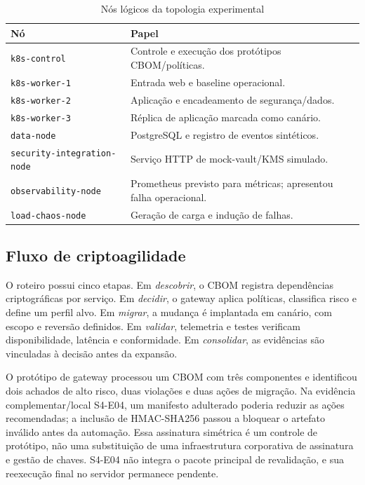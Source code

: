 \documentclass[12pt]{article}
\begin{document}
\begin{table}[ht]
\centering
\caption{N\'os l\'ogicos da topologia experimental}
\label{tab:nodes-pt}
\small
\begin{tabularx}{\textwidth}{p{}Y}
\toprule
\textbf{N\'o} & \textbf{Papel} \\
\midrule
\texttt{k8s-control} & Controle e execu\c{c}\~ao dos prot\'otipos CBOM/pol\'iticas. \\
\texttt{k8s-worker-1} & Entrada web e baseline operacional. \\
\texttt{k8s-worker-2} & Aplica\c{c}\~ao e encadeamento de seguran\c{c}a/dados. \\
\texttt{k8s-worker-3} & R\'eplica de aplica\c{c}\~ao marcada como can\'ario. \\
\texttt{data-node} & PostgreSQL e registro de eventos sint\'eticos. \\
\texttt{security-}\newline\texttt{integration-node} & Servi\c{c}o HTTP de mock-vault/KMS simulado. \\
\texttt{observability-node} & Prometheus previsto para m\'etricas; apresentou falha operacional. \\
\texttt{load-chaos-node} & Gera\c{c}\~ao de carga e indu\c{c}\~ao de falhas. \\
\bottomrule
\end{tabularx}
\end{table}

\subsection{Fluxo de criptoagilidade}
O roteiro possui cinco etapas. Em \textit{descobrir}, o CBOM registra depend\^encias criptogr\'aficas por servi\c{c}o. Em \textit{decidir}, o gateway aplica pol\'iticas, classifica risco e define um perfil alvo. Em \textit{migrar}, a mudan\c{c}a \'e implantada em can\'ario, com escopo e revers\~ao definidos. Em \textit{validar}, telemetria e testes verificam disponibilidade, lat\^encia e conformidade. Em \textit{consolidar}, as evid\^encias s\~ao vinculadas \`a decis\~ao antes da expans\~ao.

O prot\'otipo de gateway processou um CBOM com tr\^es componentes e identificou dois achados de alto risco, duas viola\c{c}\~oes e duas a\c{c}\~oes de migra\c{c}\~ao. Na evid\^encia complementar/local S4-E04, um manifesto adulterado poderia reduzir as a\c{c}\~oes recomendadas; a inclus\~ao de HMAC-SHA256 passou a bloquear o artefato inv\'alido antes da automa\c{c}\~ao. Essa assinatura sim\'etrica \'e um controle de prot\'otipo, n\~ao uma substitui\c{c}\~ao de uma infraestrutura corporativa de assinatura e gest\~ao de chaves. S4-E04 n\~ao integra o pacote principal de revalida\c{c}\~ao, e sua reexecu\c{c}\~ao final no servidor permanece pendente.
\end{document}
